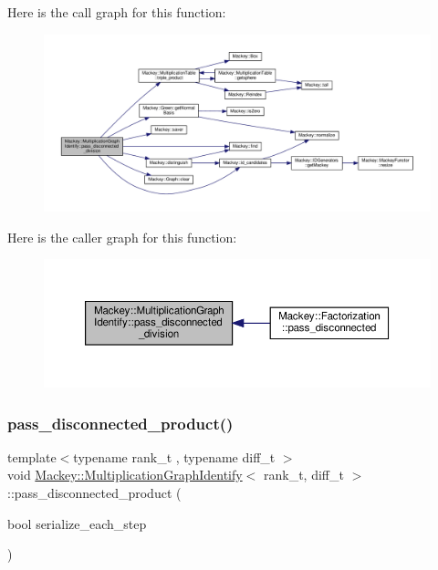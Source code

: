 Here is the call graph for this function\+:\nopagebreak
\begin{figure}[H]
\begin{center}
\leavevmode
\includegraphics[width=350pt]{classMackey_1_1MultiplicationGraphIdentify_a9791070d75d845d15f1763c03db0b5ce_cgraph}
\end{center}
\end{figure}
Here is the caller graph for this function\+:\nopagebreak
\begin{figure}[H]
\begin{center}
\leavevmode
\includegraphics[width=350pt]{classMackey_1_1MultiplicationGraphIdentify_a9791070d75d845d15f1763c03db0b5ce_icgraph}
\end{center}
\end{figure}
\mbox{\label{classMackey_1_1MultiplicationGraphIdentify_a110991be3ba595dbf401ef4a769e4dec}} 
\subsubsection{\texorpdfstring{pass\+\_\+disconnected\+\_\+product()}{pass\_disconnected\_product()}}
{\footnotesize\ttfamily template$<$typename rank\+\_\+t , typename diff\+\_\+t $>$ \\
void \hyperlink{classMackey_1_1MultiplicationGraphIdentify}{Mackey\+::\+Multiplication\+Graph\+Identify}$<$ rank\+\_\+t, diff\+\_\+t $>$\+::pass\+\_\+disconnected\+\_\+product (\begin{DoxyParamCaption}\item[{bool}]{serialize\+\_\+each\+\_\+step }\end{DoxyParamCaption})\hspace{0.3cm}{\ttfamily [protected]}}



